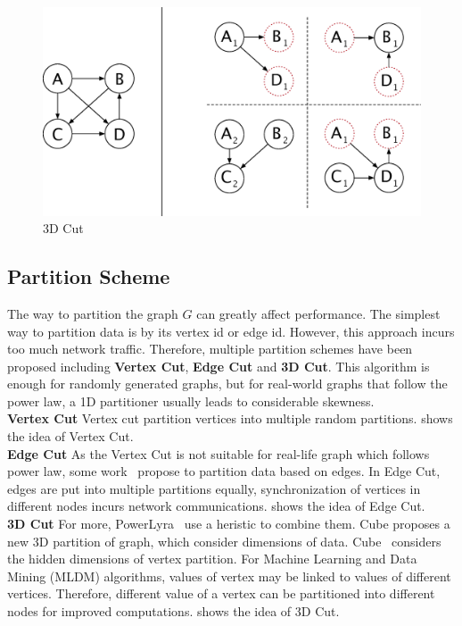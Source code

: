 \begin{figure}
  \center
  \includegraphics[width=.8\linewidth]{figures/3dcut}
  \caption{3D Cut}
  \label{fig:3dcut}
\end{figure}

\subsection{Partition Scheme}
The way to partition the graph $G$ can greatly affect performance.
The simplest way to partition data is by its vertex id or edge id.
However, this approach incurs too much network traffic. Therefore,
multiple partition schemes have been proposed including \textbf{Vertex Cut},
\textbf{Edge Cut} and \textbf{3D Cut}.
This algorithm is enough for randomly generated
graphs, but for real-world graphs that follow the
power law, a 1D partitioner usually leads to considerable
skewness.\\
\textbf{Vertex Cut} Vertex cut partition vertices into multiple
random partitions.  shows the idea of Vertex Cut. \\
\textbf{Edge Cut} As the Vertex Cut is not suitable for real-life
graph which follows power law, some work~\cite{xstream} propose to partition
data based on edges. In Edge Cut, edges are put into multiple
partitions equally, synchronization of vertices in different nodes
incurs network communications.  shows the idea of
Edge Cut. \\
\textbf{3D Cut}
For more, PowerLyra~\cite{powerlyra} use a heristic to combine them.
Cube proposes a new 3D partition of graph, which consider dimensions of data.
Cube~\cite{cube:osdi16} considers the hidden dimensions of vertex partition.
For Machine Learning and Data Mining (MLDM) algorithms, values of vertex
may be linked to values of different vertices. Therefore, different value of a vertex
can be partitioned into different nodes for improved computations. 
shows the idea of 3D Cut. \\
